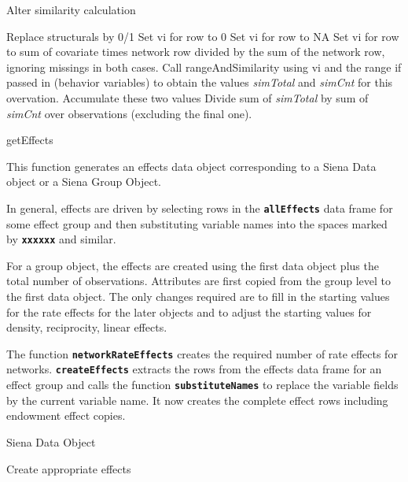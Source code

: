\documentclass[12pt,a4paper]{article}
\makeatletter
\renewcommand{\=}{\,=\,}
\newcommand{\+}{\,+\,}
\newcommand{\nnm}[1]{\textsf{\textit{#1}}}
\renewcommand{\section}{\@startsection{section}{1}
                {0pt}{\baselineskip}{0.5\baselineskip}
                {\centering\sffamily} }
\renewcommand{\subsection}{\@startsection{subsection}{2}
                {0pt}{0.7\baselineskip}{0.3\baselineskip}
                {\sffamily} }
\renewcommand{\subsubsection}{\@startsection{subsubsection}{3}
                {0pt}{0.5\baselineskip}{0.3\baselineskip}
                {\it\sffamily} }
\newcommand{\sfn}[1]{\textbf{\texttt{#1}}}
\makeatother
\begin{document}
\subsubsection{Alter similarity calculation}
\label{sec:simdist2}
\begin{algorithmic}
\STATE Replace structurals by 0/1
\STATE Set vi for row to 0
\STATE Set vi for row to NA
\ELSE
\STATE Set vi for row to sum of covariate times network row divided by the sum
of the network row, ignoring missings in both cases.
\ENDIF
\ENDFOR
\STATE Call rangeAndSimilarity using vi and the range if passed in (behavior
variables) to obtain the values \nnm{simTotal} and \nnm{simCnt} for this
overvation.
\STATE Accumulate these two values
\ENDFOR
Divide sum of \nnm{simTotal} by sum of \nnm{simCnt} over observations (excluding
the final one).
\end{algorithmic}
\section{getEffects}

This function generates an effects data object corresponding to a Siena Data
object or a Siena Group Object.

In general, effects are driven by selecting rows in the \sfn{allEffects} data
frame for some effect group and then substituting variable names into the spaces
marked by \sfn{xxxxxx} and similar.

For a group object, the effects are created using the first data object plus the
total number of observations. Attributes are first copied from the group level
to the first data object. The only changes required are to fill in the starting
values for the rate effects for the later objects and to adjust the starting
values for density, reciprocity, linear effects.

The function \sfn{networkRateEffects} creates the required number of rate
effects for networks.  \sfn{createEffects} extracts the rows from the effects
data frame for an effect group and calls the function \sfn{substituteNames} to
replace the variable fields by the current variable name. It now creates the
complete effect rows including endowment effect copies.

\subsection{Siena Data Object}
\begin{algorithmic}
\STATE Create appropriate effects
\ENDFOR
\end{algorithmic}
\end{document}
